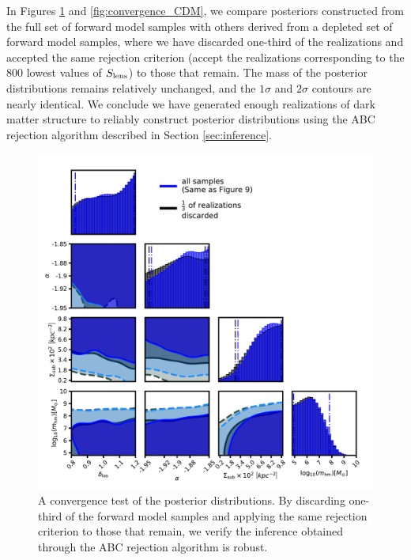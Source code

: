 In Figures \ref{fig:convergence} and \ref{fig:convergence_CDM}, we compare posteriors constructed from the full set of forward model samples with others derived from a depleted set of forward model samples, where we have discarded one-third of the realizations and accepted the same rejection criterion (accept the realizations corresponding to the 800 lowest values of $S_{\rm{lens}}$) to those that remain. The mass of the posterior distributions remains relatively unchanged, and the $1 \sigma$ and $2 \sigma$ contours are nearly identical. We conclude we have generated enough realizations of dark matter structure to reliably construct posterior distributions using the ABC rejection algorithm described in Section \ref{sec:inference}. 

\begin{figure}
	\includegraphics[clip,trim=0cm 0cm 0cm
	0cm,width=.95\textwidth,keepaspectratio]{./figures_wdmchillsout/convergence_test.pdf}
	\caption{\label{fig:convergence} A convergence test of the posterior distributions. By discarding one-third of the forward model samples and applying the same rejection criterion to those that remain, we verify the inference obtained through the ABC rejection algorithm is robust. }
\end{figure}

